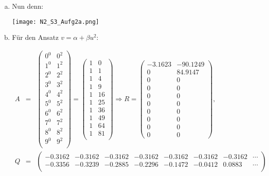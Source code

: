 \documentclass[11pt]{article} %
\begin{document}
\begin{enumerate}[a)]

\item Nun denn:

\texttt{[image: N2\_S3\_Aufg2a.png]}

\item Für den Ansatz $v = \alpha + \beta u^2$:

\begin{eqnarray*}
A &=& \begin{pmatrix}
	0^0 & 0^2 \\
	1^0 & 1^2 \\
	2^0 & 2^2 \\
	3^0 & 3^2 \\
	4^0 & 4^2 \\
	5^0 & 5^2 \\
	6^0 & 6^2 \\
	7^0 & 7^2 \\
	8^0 & 8^2 \\
	9^0 & 9^2 \\
\end{pmatrix} = \begin{pmatrix}
	1 & 0 \\
	1 & 1 \\
	1 & 4 \\
	1 & 9 \\
	1 & 16 \\
	1 & 25 \\
	1 & 36 \\
	1 & 49 \\
	1 & 64 \\
	1 & 81 \\
\end{pmatrix}
\Rightarrow R = \begin{pmatrix} -3.1623 &  -90.1249  \\  0 &  84.9147  \\ 0 &0 \\ 0 &0 \\0 &0 \\0 &0 \\0 &0 \\0 &0 \\0 &0 \\0 &0 \end{pmatrix}, \\ Q &=& \begin{pmatrix}
-0.3162 &  -0.3162 &   -0.3162 &  -0.3162 &  -0.3162 &  -0.3162 &  -0.3162 & \cdots \\
-0.3356   &-0.3239  & -0.2885  & -0.2296  & -0.1472  & -0.0412  &  0.0883  &  \cdots \\

\end{pmatrix}
\end{eqnarray*}
\end{enumerate}
\end{document}
